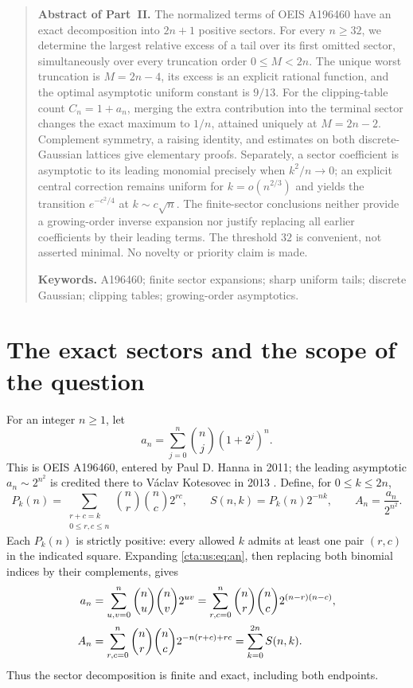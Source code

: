 \documentclass[11pt]{article}
\theoremstyle{definition}
\theoremstyle{remark}
\begin{document}
\begin{quotation}
\small
\noindent\textbf{Abstract of Part~II.}
The normalized terms of OEIS A196460 have an exact decomposition into
$2n+1$ positive sectors. For every $n\ge32$, we determine the largest
relative excess of a tail over its first omitted sector, simultaneously
over every truncation order $0\le M<2n$. The unique worst truncation is
$M=2n-4$, its excess is an explicit rational function, and the optimal
asymptotic uniform constant is $9/13$. For the clipping-table count
$C_n=1+a_n$, merging the extra contribution into the terminal sector
changes the exact maximum to $1/n$, attained uniquely at $M=2n-2$.
Complement symmetry, a raising identity, and estimates on both
discrete-Gaussian lattices give elementary proofs. Separately, a sector
coefficient is asymptotic to its leading monomial precisely when
$k^2/n\to0$; an explicit central correction remains uniform for
$k=o(n^{2/3})$ and yields the transition $e^{-c^2/4}$ at
$k\sim c\sqrt n$. The finite-sector conclusions neither provide a
growing-order inverse expansion nor justify replacing all earlier
coefficients by their leading terms. The threshold $32$ is convenient,
not asserted minimal. No novelty or priority claim is made.

\smallskip
\noindent\textbf{Keywords.} A196460; finite sector expansions; sharp uniform
tails; discrete Gaussian; clipping tables; growing-order asymptotics.

\end{quotation}

\section{The exact sectors and the scope of the question}\label{cta:us:sec:setup}

For an integer $n\ge1$, let
\begin{equation}\label{cta:us:eq:an}
 a_n=\sum_{j=0}^n\binom nj(1+2^j)^n.
\end{equation}
This is OEIS A196460, entered by Paul D. Hanna in 2011; the leading
asymptotic $a_n\sim2^{n^2}$ is credited there to V\'aclav Kotesovec in
2013 \cite{oeis}. Define, for $0\le k\le2n$,
\begin{equation}\label{cta:us:eq:sectors}
 P_k(n)=\sum_{\substack{r+c=k\\0\le r,c\le n}}
       \binom nr\binom nc2^{rc},\qquad
 S(n,k)=P_k(n)2^{-nk},\qquad A_n=\frac{a_n}{2^{n^2}}.
\end{equation}
Each $P_k(n)$ is strictly positive: every allowed $k$ admits at least
one pair $(r,c)$ in the indicated square. Expanding \eqref{cta:us:eq:an},
then replacing both binomial indices by their complements, gives
\begin{align}\label{cta:us:eq:normalization}
 a_n&=\sum_{u,v=0}^n\binom nu\binom nv2^{uv}
     =\sum_{r,c=0}^n\binom nr\binom nc2^{(n-r)(n-c)},\notag\\
 A_n&=\sum_{r,c=0}^n\binom nr\binom nc2^{-n(r+c)+rc}
     =\sum_{k=0}^{2n}S(n,k).
\end{align}
Thus the sector decomposition is finite and exact, including both endpoints.
\end{document}
